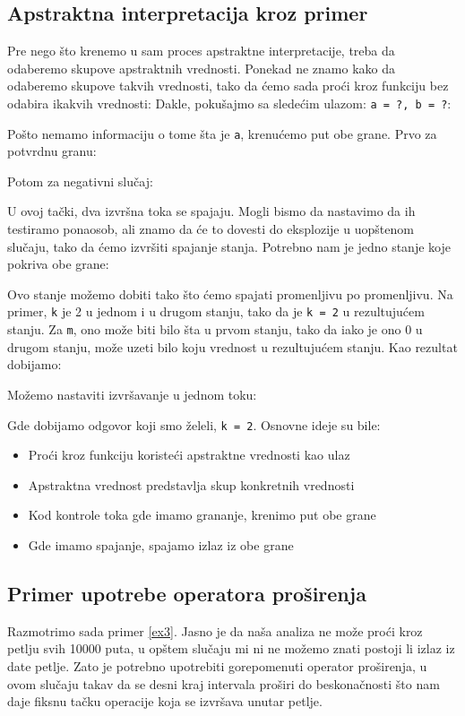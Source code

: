 \subsection{Apstraktna interpretacija kroz primer}
\label{subsec:absintex}
Pre nego što krenemo u sam proces apstraktne interpretacije, treba da odaberemo
skupove apstraktnih vrednosti. Ponekad ne znamo kako da odaberemo skupove takvih
vrednosti, tako da ćemo sada proći kroz funkciju bez odabira ikakvih vrednosti:
Dakle, pokušajmo sa sledećim ulazom: \texttt{a = ?, b = ?}:

Pošto nemamo informaciju o tome šta je \texttt{a}, krenućemo put obe grane.
Prvo za potvrdnu granu:

Potom za negativni slučaj:

U ovoj tački, dva izvršna toka se spajaju. Mogli bismo da nastavimo da ih testiramo
ponaosob, ali znamo da će to dovesti do eksplozije u uopštenom slučaju, tako da ćemo
izvršiti spajanje stanja. Potrebno nam je jedno stanje koje pokriva obe grane:

Ovo stanje možemo dobiti tako što ćemo spajati promenljivu po promenljivu. Na primer,
\texttt{k} je 2 u jednom i u drugom stanju, tako da je \texttt{k = 2} u rezultujućem
stanju. Za \texttt{m}, ono može biti bilo šta u prvom stanju, tako da iako je ono 0
u drugom stanju, može uzeti bilo koju vrednost u rezultujućem stanju. Kao rezultat dobijamo:

Možemo nastaviti izvršavanje u jednom toku:

Gde dobijamo odgovor koji smo želeli, \texttt{k = 2}. Osnovne ideje su bile:
\begin{itemize}
\item Proći kroz funkciju koristeći apstraktne vrednosti kao ulaz
\item Apstraktna vrednost predstavlja skup konkretnih vrednosti
\item Kod kontrole toka gde imamo grananje, krenimo put obe grane
\item Gde imamo spajanje, spajamo izlaz iz obe grane
\end{itemize}
\cite{MozWiki}

\subsection{Primer upotrebe operatora proširenja}
\label{subsec:widening}

Razmotrimo sada primer \ref{ex3}. Jasno je da naša analiza ne može proći kroz petlju svih 10000 puta, u opštem slučaju mi ni ne možemo znati postoji li izlaz iz date petlje. Zato je potrebno upotrebiti gorepomenuti operator proširenja, u ovom slučaju takav da se desni kraj intervala proširi do beskonačnosti što nam daje fiksnu tačku operacije koja se izvršava unutar petlje. \\ 

